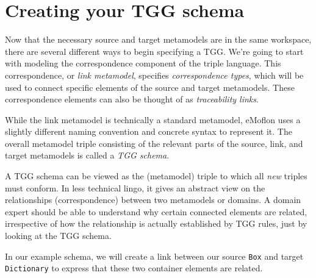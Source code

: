 \newpage
\hypertarget{TGGSchema}{}
\section{Creating your TGG schema}
\genHeader

Now that the necessary source and target metamodels are in the same workspace, there are several different ways to begin specifying a TGG. We're going to start
with modeling the correspondence component of the triple language. This correspondence, or \emph{link metamodel}, specifies
\emph{correspondence types}, which will be used to connect specific elements of the source and target metamodels. These
correspondence elements can also be thought of as \emph{traceability links}.

While the link metamodel is technically a standard metamodel, eMoflon uses a slightly different naming convention and concrete syntax to represent it. The
overall metamodel triple consisting of the relevant parts of the source, link, and target metamodels is called a \emph{TGG schema}.

A TGG schema can be viewed as the (metamodel) triple to which all \emph{new} triples must conform. In less technical lingo, it gives an abstract view on the
relationships (correspondence) between two metamodels or domains. A domain expert should be able to understand why certain connected elements are related,
irrespective of how the relationship is actually established by TGG rules, just by looking at the TGG schema. 

In our example schema, we will create a link between our source \texttt{Box} and target \texttt{Dictionary} to express that these two container elements are
related.


